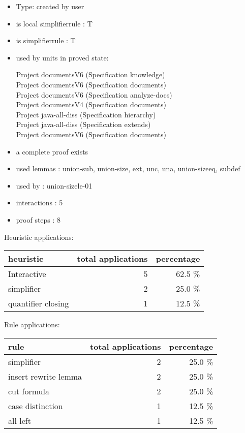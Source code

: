 \documentclass[a4paper]{article}
\begin{document}
\begin{itemize}

\item Type: created by user

\item is local simplifierrule : T
\item is simplifierrule : T
\item used by units in proved state:

Project documentsV6 (Specification knowledge) \\
Project documentsV6 (Specification documents) \\
Project documentsV6 (Specification analyze-docs) \\
Project documentsV4 (Specification documents) \\
Project java-all-diss (Specification hierarchy) \\
Project java-all-diss (Specification extends) \\
Project documentsV6 (Specification documents)
\item       a complete proof exists
\item       used lemmas  : union-sub, union-size, ext, unc, una, union-sizeeq, subdef
\item       used by      : union-sizele-01
\item       interactions : 5
\item       proof steps  : 8
\end{itemize}

\medskip


Heuristic applications:

\begin{supertabular}{l|r|r}
heuristic	& total applications & percentage \\ \hline
Interactive & 5 & 62.5 \% \\
simplifier & 2 & 25.0 \% \\
quantifier closing & 1 & 12.5 \% \\

\end{supertabular}

Rule applications:

\begin{supertabular}{l|r|r}
rule	        & total applications & percentage \\ \hline
simplifier & 2 & 25.0 \% \\
insert rewrite lemma & 2 & 25.0 \% \\
cut formula & 2 & 25.0 \% \\
case distinction & 1 & 12.5 \% \\
all left & 1 & 12.5 \% \\

\end{supertabular}
\end{document}
